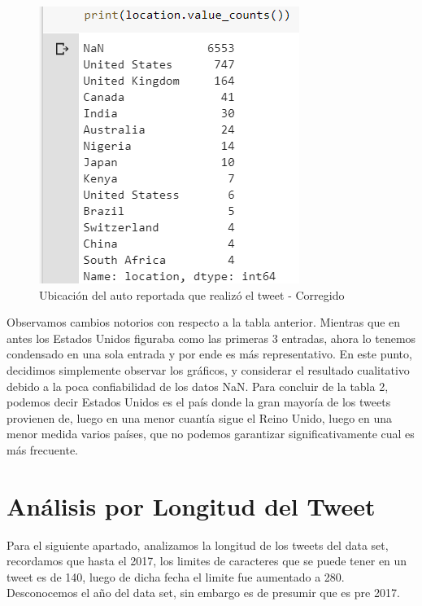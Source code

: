 \documentclass[]{article}
\begin{document}
 \begin{figure}[H]
	\centering
	\includegraphics[width=0.75\linewidth]{location2}
	\caption[]{Ubicaci\'on del auto reportada que realiz\'o el tweet - Corregido}
\end{figure}

Observamos cambios notorios con respecto a la tabla anterior. Mientras que en antes los Estados Unidos figuraba como las primeras 3 entradas, ahora lo tenemos condensado en una sola entrada y por ende es m\'as representativo. En este punto, decidimos simplemente observar los gr\'aficos, y considerar el resultado cualitativo debido a la poca confiabilidad de los datos NaN. Para concluir de la tabla 2, podemos decir Estados Unidos es el pa\'is donde la gran mayor\'ia de los tweets provienen de, luego en una menor cuant\'ia sigue el Reino Unido, luego en una menor medida varios pa\'ises, que no podemos garantizar significativamente cual es m\'as frecuente. 

\section{An\'alisis por Longitud del Tweet}
Para el siguiente apartado, analizamos la longitud de los tweets del data set, recordamos que hasta el 2017, los limites de caracteres que se puede tener en un tweet es de 140, luego de dicha fecha el limite fue aumentado a 280. Desconocemos el año del data set, sin embargo es de presumir que es pre 2017. 
\end{document}
